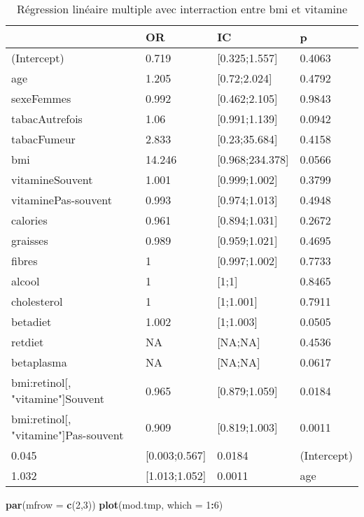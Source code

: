 \documentclass[]{article}
\newenvironment{Shaded}{\begin{snugshade}}{\end{snugshade}}
\newcommand{\KeywordTok}[1]{\textcolor[rgb]{0.13,0.29,0.53}{\textbf{#1}}}
\newcommand{\DataTypeTok}[1]{\textcolor[rgb]{0.13,0.29,0.53}{#1}}
\newcommand{\DecValTok}[1]{\textcolor[rgb]{0.00,0.00,0.81}{#1}}
\newcommand{\OperatorTok}[1]{\textcolor[rgb]{0.81,0.36,0.00}{\textbf{#1}}}
\newcommand{\NormalTok}[1]{#1}
\begin{document}
\begin{table}

\caption{\label{tab:unnamed-chunk-86}Régression linéaire multiple avec interraction entre bmi et vitamine}
\centering
\begin{tabular}[t]{l|l|l|l}
\hline
  & OR & IC & p\\
\hline
\rowcolor[HTML]{BBD2E1}  (Intercept) & 0.719 & [0.325;1.557] & 0.4063\\
\hline
age & 1.205 & [0.72;2.024] & 0.4792\\
\hline
\rowcolor[HTML]{BBD2E1}  sexeFemmes & 0.992 & [0.462;2.105] & 0.9843\\
\hline
tabacAutrefois & 1.06 & [0.991;1.139] & 0.0942\\
\hline
\rowcolor[HTML]{BBD2E1}  tabacFumeur & 2.833 & [0.23;35.684] & 0.4158\\
\hline
bmi & 14.246 & [0.968;234.378] & 0.0566\\
\hline
\rowcolor[HTML]{BBD2E1}  vitamineSouvent & 1.001 & [0.999;1.002] & 0.3799\\
\hline
vitaminePas-souvent & 0.993 & [0.974;1.013] & 0.4948\\
\hline
\rowcolor[HTML]{BBD2E1}  calories & 0.961 & [0.894;1.031] & 0.2672\\
\hline
graisses & 0.989 & [0.959;1.021] & 0.4695\\
\hline
\rowcolor[HTML]{BBD2E1}  fibres & 1 & [0.997;1.002] & 0.7733\\
\hline
alcool & 1 & [1;1] & 0.8465\\
\hline
\rowcolor[HTML]{BBD2E1}  cholesterol & 1 & [1;1.001] & 0.7911\\
\hline
betadiet & 1.002 & [1;1.003] & 0.0505\\
\hline
\rowcolor[HTML]{BBD2E1}  retdiet & NA & [NA;NA] & 0.4536\\
\hline
betaplasma & NA & [NA;NA] & 0.0617\\
\hline
\rowcolor[HTML]{BBD2E1}  bmi:retinol[, "vitamine"]Souvent & 0.965 & [0.879;1.059] & 0.0184\\
\hline
bmi:retinol[, "vitamine"]Pas-souvent & 0.909 & [0.819;1.003] & 0.0011\\
\hline
\rowcolor[HTML]{BBD2E1}  0.045 & [0.003;0.567] & 0.0184 & (Intercept)\\
\hline
1.032 & [1.013;1.052] & 0.0011 & age\\
\hline
\end{tabular}
\end{table}

\begin{Shaded}
\begin{Highlighting}[]
\KeywordTok{par}\NormalTok{(}\DataTypeTok{mfrow =} \KeywordTok{c}\NormalTok{(}\DecValTok{2}\NormalTok{,}\DecValTok{3}\NormalTok{))}
\KeywordTok{plot}\NormalTok{(mod.tmp, }\DataTypeTok{which =} \DecValTok{1}\OperatorTok{:}\DecValTok{6}\NormalTok{)}
\end{Highlighting}
\end{Shaded}
\end{document}

